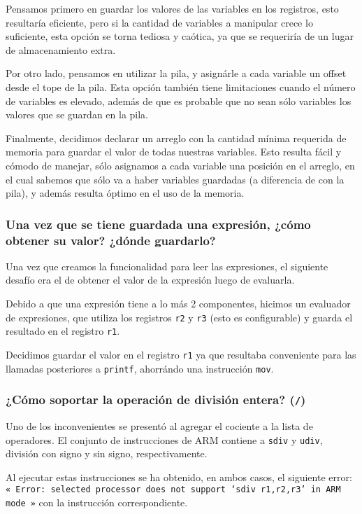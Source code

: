 \documentclass[12pt,spanish]{article}
\begin{document}
Pensamos primero en guardar los valores de las variables en los registros, esto resultaría eficiente, pero si la cantidad de variables a manipular crece lo suficiente, esta opción se torna tediosa y caótica, ya que se requeriría de un lugar de almacenamiento extra.

Por otro lado, pensamos en utilizar la pila, y asignárle a cada variable un offset desde el tope de la pila. Esta opción también tiene limitaciones cuando el número de variables es elevado, además de que es probable que no sean sólo variables los valores que se guardan en la pila.

Finalmente, decidimos declarar un arreglo con la cantidad mínima requerida de memoria para guardar el valor de todas nuestras variables. Esto resulta fácil y cómodo de manejar, sólo asignamos a cada variable una posición en el arreglo, en el cual sabemos que sólo va a haber variables guardadas (a diferencia de con la pila), y además resulta óptimo en el uso de la memoria.

\subsubsection{Una vez que se tiene guardada una expresión, ¿cómo obtener su valor? ¿dónde guardarlo?}

Una vez que creamos la funcionalidad para leer las expresiones, el siguiente desafío era el de obtener el valor de la expresión luego de evaluarla. 

Debido a que una expresión tiene a lo más 2 componentes, hicimos un evaluador de expresiones, que utiliza los registros \texttt{r2} y \texttt{r3} (esto es configurable) y guarda el resultado en el registro \texttt{r1}.

Decidimos guardar el valor en el registro \texttt{r1} ya que resultaba conveniente para las llamadas posteriores a \texttt{printf}, ahorrándo una instrucción \texttt{mov}.

\subsubsection{¿Cómo soportar la operación de división entera? (\texttt{/})}

Uno de los inconvenientes se presentó al agregar el cociente a la lista de operadores. El conjunto de instrucciones de ARM contiene a \texttt{sdiv} y \texttt{udiv}, división con signo y sin signo, respectivamente. 

Al ejecutar estas instrucciones se ha obtenido, en ambos casos, el siguiente error: \texttt{« Error: selected processor does not support `sdiv r1,r2,r3' in ARM mode »} con la instrucción correspondiente.
\end{document}
